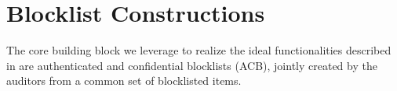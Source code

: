 \newcommand{\authBlocklistFunc}{\ensuremath{\mathcal{F}_{\mathsf{AuthBlk}}}\xspace}
\newcommand{\blindedBlocklist}{\ensuremath{\blocklist^{(\mathsf{blind})}}\xspace}
\NewDocumentCommand{\oprfBlindingFactor}{o}{\ensuremath{r_{#1}}\xspace}
\newcommand{\preprocess}{\ensuremath{\mathsf{Preprocess}}\xspace}
\newcommand{\searchBlocklist}{\ensuremath{\mathsf{Search}}\xspace}
\newcommand{\thresholdSearchBlocklist}{\ensuremath{\mathsf{TSearch}}\xspace}
\newcommand{\blocklistBlindingAlg}{\ensuremath{f^{\mathsf{blind}}}\xspace}
\newcommand{\blocklistBlindingKeySpace}{\ensuremath{\mathcal{K}_{blind}}\xspace}
\newcommand{\blocklistBlindingKey}{\ensuremath{k_{blind}}\xspace} 
\newcommand{\publishList}{\ensuremath{\mathsf{Publish}}\xspace}

\newcommand{\preprocessFn}{\ensuremath{f^{pre}}\xspace}
\newcommand{\preprocessOutputSpace}{\ensuremath{\mathcal{V}}\xspace}
\newcommand{\clientSecretKey}{\ensuremath{sk_{client}}\xspace}
\newcommand{\clientSecretKeySpace}{\ensuremath{\mathcal{K}_{client}}\xspace}
\newcommand{\serverSecretKey}{\ensuremath{sk_{server}}\xspace}
\newcommand{\serverSecretKeySpace}{\ensuremath{\mathcal{K}_{server}}\xspace}

\newcommand{\genericCInputSet}{\ensuremath{Y}\xspace}

\section{Blocklist Constructions}
\label{sec:acb}
%




The core building block we leverage to realize the ideal functionalities described in  are authenticated and confidential blocklists (ACB), jointly created by the auditors from a common set of blocklisted items. 




